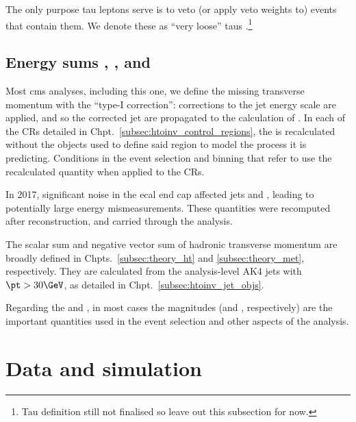 The only purpose tau leptons \Ptau serve is to veto (or apply veto weights to) events that contain them. We denote these as ``very loose'' taus \vlooseTau.\footnote{Tau definition still not finalised so leave out this subsection for now.}




\subsection{Energy sums \texorpdfstring{\ptvecmiss}{ptmiss}, \texorpdfstring{\HT}{HT}, and \texorpdfstring{\htvecmiss}{MHT}}
\label{subsec:htoinv_met_obj}

Most \acrshort{cms} analyses, including this one, we define the missing transverse momentum with the ``type-I correction'': corrections to the \gls{jet} energy scale are applied, and so the corrected \gls{jet} \ptvec are propagated to the calculation of \ptvecmiss. In each of the \glspl{CR} detailed in Chpt.~\ref{subsec:htoinv_control_regions}, the \ptvecmiss is recalculated without the objects used to define said region to model the process it is predicting. Conditions in the event selection and binning that refer to \ptmiss use the recalculated quantity when applied to the \glspl{CR}.

In 2017, significant noise in the \acrshort{ecal} end cap affected \glspl{jet} and \ptmiss, leading to potentially large energy mismeasurements. These quantities were recomputed after reconstruction, and carried through the analysis.

The scalar sum \HT and negative vector sum of hadronic transverse momentum \htvecmiss are broadly defined in Chpts.~\ref{subsec:theory_ht} and \ref{subsec:theory_met}, respectively. They are calculated from the analysis-level AK4 jets with $\pt > \text{30}\GeV$, as detailed in Chpt.~\ref{subsec:htoinv_jet_objs}.

Regarding the \ptvecmiss and \htvecmiss, in most cases the magnitudes (\ptmiss and \mht, respectively) are the important quantities used in the event selection and other aspects of the analysis.




\section{Data and simulation}
\label{sec:htoinv_data_sim}


